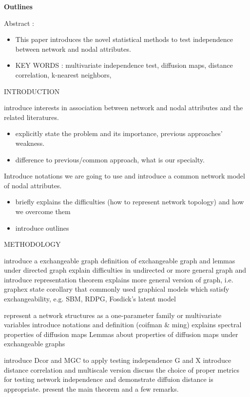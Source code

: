 \documentclass[12pt]{article}
\theoremstyle{definition}
\begin{document}
\textbf{Outlines}
\bigskip
\begin{outline}[enumerate]
\1 Abstract : 
\begin{itemize}
	\item This paper introduces the novel statistical methods to test independence between network and nodal attributes.

	\item KEY WORDS : multivariate independence test, diffusion maps, distance correlation, k-nearest neighbors,

\end{itemize}

\1 INTRODUCTION

\2 introduce interests in association between network and nodal attributes and the related literatures.
\begin{itemize}
\item explicitly state the problem and its importance, previous approaches' weakness. 
\item difference to previous/common approach, what is our specialty.
\end{itemize}

\2 Introduce notations we are going to use and introduce a common network model of nodal attributes.
\begin{itemize}
\item briefly explains the difficulties (how to represent network topology) and how we overcome them
\item introduce outlines
\end{itemize}

\1 METHODOLOGY

	\2 introduce a exchangeable graph
		\3 definition of exchangeable graph and lemmas under directed graph
		\3 explain difficulties in undirected or more general graph and introduce representation theorem
		\3 explains more general version of graph, i.e. graphex
		\3 state corollary that commonly used graphical models which satisfy exchangeability, e.g. SBM, RDPG, Fosdick's latent model

	\2 represent a network structures as a one-parameter family or multivariate variables
		\3 introduce notations and definition (coifman $\&$ ming)
		\3 explains spectral properties of diffusion maps
		\3 Lemmas about properties of diffusion maps under exchangeable graphs

	\2 introduce Dcor and MGC to apply testing independence G and X
		\3 introduce distance correlation and multiscale version
		\3 discuss the choice of proper metrics for testing network independence and demonstrate diffuion distance is appropriate.
		\3 present the main theorem and a few remarks.



\end{outline}
\end{document}

